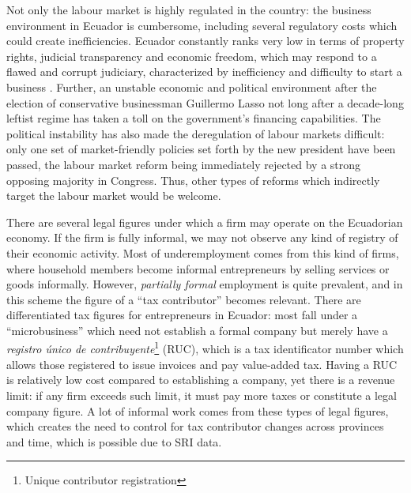 \documentclass[11pt,a4paper]{article}\usepackage[]{graphicx}\usepackage[]{xcolor}
\begin{document}
Not only the labour market is highly regulated in the country: the business environment in Ecuador is cumbersome, including several regulatory costs which could create inefficiencies. Ecuador constantly ranks very low in terms of property rights, judicial transparency and economic freedom, which may respond to a flawed and corrupt judiciary, characterized by inefficiency and difficulty to start a business \textcite{Euromonitor.2022}. Further, an unstable economic and political environment after the election of conservative businessman Guillermo Lasso not long after a decade-long leftist regime has taken a toll on the government's financing capabilities. The political instability has also made the deregulation of labour markets difficult: only one set of market-friendly policies set forth by the new president have been passed, the labour market reform being immediately rejected by a strong opposing majority in Congress. Thus, other types of reforms which indirectly target the labour market would be welcome. 

There are several legal figures under which a firm may operate on the Ecuadorian economy. If the firm is fully informal, we may not observe any kind of registry of their economic activity. Most of underemployment comes from this kind of firms, where household members become informal entrepreneurs by selling services or goods informally. However, \textit{partially formal} employment is quite prevalent, and in this scheme the figure of a ``tax contributor'' becomes relevant. There are differentiated tax figures for entrepreneurs in Ecuador: most fall under a ``microbusiness'' which need not establish a formal company but merely have a \textit{registro único de contribuyente}\footnote{Unique contributor registration} (RUC), which is a tax identificator number which allows those registered to issue invoices and pay value-added tax. Having a RUC is relatively low cost compared to establishing a company, yet there is a revenue limit: if any firm exceeds such limit, it must pay more taxes or constitute a legal company figure. A lot of informal work comes from these types of legal figures, which creates the need to control for tax contributor changes across provinces and time, which is possible due to SRI data.
\end{document}
